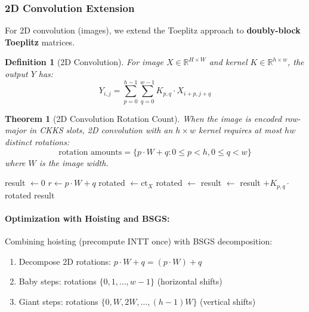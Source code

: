 \documentclass[11pt,a4paper]{article}
\newtheorem{definition}{Definition}
\newtheorem{theorem}{Theorem}
\begin{document}
\subsubsection{2D Convolution Extension}

For 2D convolution (images), we extend the Toeplitz approach to \textbf{doubly-block Toeplitz} matrices.

\begin{definition}[2D Convolution]
For image $X \in \mathbb{R}^{H \times W}$ and kernel $K \in \mathbb{R}^{h \times w}$, the output $Y$ has:
\[
Y_{i,j} = \sum_{p=0}^{h-1} \sum_{q=0}^{w-1} K_{p,q} \cdot X_{i+p, j+q}
\]
\end{definition}

\begin{theorem}[2D Convolution Rotation Count]
When the image is encoded row-major in CKKS slots, 2D convolution with an $h \times w$ kernel requires at most $hw$ distinct rotations:
\[
\text{rotation amounts} = \{ p \cdot W + q : 0 \leq p < h, 0 \leq q < w \}
\]
where $W$ is the image width.
\end{theorem}

\begin{algorithm}[H]
\caption{2D Convolution via Rotations}
\begin{algorithmic}[1]
    \State {}
    \State result $\gets 0$
            \State $r \gets p \cdot W + q$ 
                \State rotated $\gets \text{ct}_X$
            \Else
                \State rotated $\gets$ 
            \EndIf
            \State result $\gets$ result $+ K_{p,q} \cdot$ rotated
        \EndFor
    \EndFor
    \State \Return result
\EndFunction
\end{algorithmic}
\end{algorithm}

\paragraph{Optimization with Hoisting and BSGS:}
Combining hoisting (precompute INTT once) with BSGS decomposition:
\begin{enumerate}
    \item Decompose 2D rotations: $p \cdot W + q = (p \cdot W) + q$
    \item Baby steps: rotations $\{0, 1, \ldots, w-1\}$ (horizontal shifts)
    \item Giant steps: rotations $\{0, W, 2W, \ldots, (h-1)W\}$ (vertical shifts)
\end{enumerate}
\end{document}
